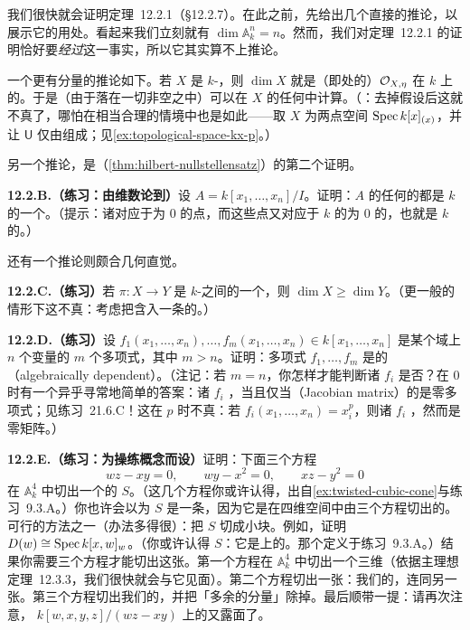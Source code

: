 我们很快就会证明定理~12.2.1（\S12.2.7）。在此之前，先给出几个直接的推论，以展示它的用处。看起来我们立刻就有 $\dim\mathbb{A}^n_k=n$。然而，我们对定理~12.2.1 的证明恰好要\emph{经过}这一事实，所以它其实算不上推论。

一个更有分量的推论如下。若 $X$ 是\trIrreducible{} $k$-\trVariety，则 $\dim X$ 就是\trFunctionField{}（即\trGenericPoint{}处的\trStalk）$\mathcal{O}_{X,\eta}$ 在 $k$ 上的\trTrDeg。于是（由于\trGenericPoint{}落在一切非空\trOpenSet{}之中）\trDimension{}可以在 $X$ 的任何\trOpenSet{}中计算。（\trhWarning{}：去掉\trFiniteType{}假设后这就不真了，哪怕在相当合理的情境中也是如此——取 $X$ 为两点空间 $\operatorname{Spec} k[x]_{(x)}$，并让 $\mathsf{U}$ 仅由\trGenericPoint{}组成；见\cref{ex:topological-space-kx-p}。）

另一个推论，是\trNullstellensatz{}（\cref{thm:hilbert-nullstellensatz}）的第二个证明。

\textbf{12.2.B.（练习：由维数论到\trNullstellensatz）}\quad 设 $A=k[x_1,\dots,x_n]/I$。证明：$A$ 的任何\trMaximalIdeal{}的\trResidueField{}都是 $k$ 的一个\trFiniteFieldExtension。（提示：诸\trMaximalIdeal{}对应于\trDimension{}为 $0$ 的点，而这些点又对应于 $k$ 的\trTrDeg{}为 $0$ 的\trFinitelyGenerated\trExtension，也就是 $k$ 的\trFiniteFieldExtension。）

还有一个推论则颇合几何直觉。

\textbf{12.2.C.（练习）}\quad 若 $\pi\colon X\to Y$ 是\trIrreducible{} $k$-\trVariety{}之间的一个\trDominant{}\trMorphism，则 $\dim X\ge\dim Y$。（更一般的情形下这不真：考虑把\trGenericPoint{}含入一条\trIrreducible\trCurve{}的\trInclusionMap。）

\textbf{12.2.D.（练习）}\quad 设 $f_1(x_1,\dots,x_n),\dots,f_m(x_1,\dots,x_n)\in k[x_1,\dots,x_n]$ 是某个域上 $n$ 个变量的 $m$ 个多项式，其中 $m>n$。证明：多项式 $f_1,\dots,f_m$ 是\trAlgebraicallyDependent{}的（algebraically dependent）。（注记：若 $m=n$，你怎样才能判断诸 $f_i$ 是否\trAlgebraicallyIndependent？在\trCharacteristic{} $0$ 时有一个异乎寻常地简单的答案：诸 $f_i$ \trAlgebraicallyDependent，当且仅当\textbf{\trJacobianMatrix}（Jacobian matrix）的\trDeterminant{}是零多项式；见\mbox{练习~21.6.C}！这在\trCharacteristic{} $p$ 时不真：若 $f_i(x_1,\dots,x_n)=x_i^p$，则诸 $f_i$ \trAlgebraicallyIndependent，然而\trJacobianMatrix{}是零矩阵。）

\textbf{12.2.E.（练习：为操练概念而设）}\quad 证明：下面三个方程
\[
wz-xy=0,\qquad wy-x^2=0,\qquad xz-y^2=0
\]
在 $\mathbb{A}^4_k$ 中切出一个\trIntegral{}的\trSurface{} $S$。（这几个方程你或许认得，出自\cref{ex:twisted-cubic-cone}与\mbox{练习~9.3.A}。）你也许会以为 $S$ 是一条\trCurve，因为它是在四维空间中由三个方程切出的。可行的方法之一（办法多得很）：把 $S$ 切成小块。例如，证明 $D(w)\cong\operatorname{Spec} k[x,w]_w$。（你或许认得 $S$：它是\trTwistedCubic{}上的\trAffine\trCone。那个\trTwistedCubic{}定义于\mbox{练习~9.3.A}。）结果你需要三个方程才能切出这张\trSurface。第一个方程在 $\mathbb{A}^4_k$ 中切出一个三维\trVariety（依据\trKrull{}主理想定理~12.3.3，我们很快就会与它见面）。第二个方程切出一张\trSurface：我们的\trSurface，连同另一张\trSurface。第三个方程切出我们的\trSurface，并把「多余的分量」除掉。最后顺带一提：请再次注意，\trQuadricSurface{} $k[w,x,y,z]/(wz-xy)$ 上的\trCone{}又露面了。

